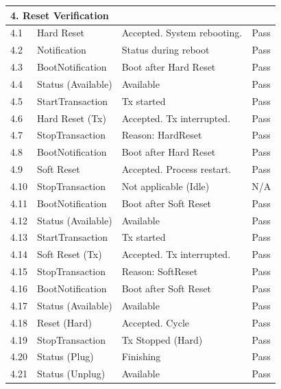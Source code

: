 \documentclass[a4paper,11pt]{report}
\begin{document}
\begin{footnotesize}
\begin{footnotesize}
\begin{longtable}{|p{1.0cm}|p{4.5cm}|p{6.5cm}|c|}
\multicolumn{4}{|l|}{\textbf{4. Reset Verification}} \\
\hline
4.1 & Hard Reset & Accepted. System rebooting. & Pass \\
\hline
4.2 & Notification & Status during reboot & Pass \\
\hline
4.3 & BootNotification & Boot after Hard Reset & Pass \\
\hline
4.4 & Status (Available) & Available & Pass \\
\hline
4.5 & StartTransaction & Tx started & Pass \\
\hline
4.6 & Hard Reset (Tx) & Accepted. Tx interrupted. & Pass \\
\hline
4.7 & StopTransaction & Reason: HardReset & Pass \\
\hline
4.8 & BootNotification & Boot after Hard Reset & Pass \\
\hline
4.9 & Soft Reset & Accepted. Process restart. & Pass \\
\hline
4.10 & StopTransaction & Not applicable (Idle) & N/A \\
\hline
4.11 & BootNotification & Boot after Soft Reset & Pass \\
\hline
4.12 & Status (Available) & Available & Pass \\
\hline
4.13 & StartTransaction & Tx started & Pass \\
\hline
4.14 & Soft Reset (Tx) & Accepted. Tx interrupted. & Pass \\
\hline
4.15 & StopTransaction & Reason: SoftReset & Pass \\
\hline
4.16 & BootNotification & Boot after Soft Reset & Pass \\
\hline
4.17 & Status (Available) & Available & Pass \\
\hline
4.18 & Reset (Hard) & Accepted. Cycle & Pass \\
\hline
4.19 & StopTransaction & Tx Stopped (Hard) & Pass \\
\hline
4.20 & Status (Plug) & Finishing & Pass \\
\hline
4.21 & Status (Unplug) & Available & Pass \\
\hline


\end{longtable}
\end{footnotesize}
\end{footnotesize}
\end{document}
